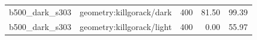 \begin{longtable}{l>{\raggedright\arraybackslash}p{.42\linewidth}rrr}
b500\_\allowbreak{}dark\_\allowbreak{}s303 & %
geometry:killgorack/dark & %
400 & %
81.50 & %
99.39 \\ %

b500\_\allowbreak{}dark\_\allowbreak{}s303 & %
geometry:killgorack/light & %
400 & %
0.00 & %
55.97 \\ %


\end{longtable}
